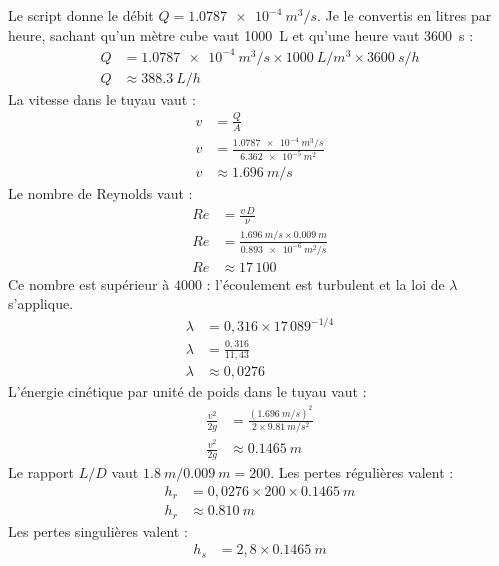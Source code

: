 \begin{demonstration}
Le script donne le débit $Q = \qty{1,0787e-4}{m^3/s}$. Je le convertis en litres par heure, sachant qu'un mètre cube vaut \qty{1000}{L} et qu'une heure vaut \qty{3600}{s} :
\begin{align*}
Q &= \qty{1,0787e-4}{m^3/s} \times \qty{1000}{L/m^3} \times \qty{3600}{s/h}\\
Q &\approx \qty{388,3}{L/h}
\end{align*}
La vitesse dans le tuyau vaut :
\begin{align*}
v &= \frac{Q}{A}\\
v &= \frac{\qty{1,0787e-4}{m^3/s}}{\qty{6,362e-5}{m^2}}\\
v &\approx \qty{1,696}{m/s}
\end{align*}
Le nombre de Reynolds vaut :
\begin{align*}
Re &= \frac{v\,D}{\nu}\\
Re &= \frac{\qty{1,696}{m/s}\times\qty{0,009}{m}}{\qty{0,893e-6}{m^2/s}}\\
Re &\approx 17\,100
\end{align*}
Ce nombre est supérieur à $4000$ : l'écoulement est turbulent et la loi de $\lambda$ s'applique.
\begin{align*}
\lambda &= 0,316 \times 17\,089^{-1/4}\\
\lambda &= \frac{0,316}{11,43}\\
\lambda &\approx 0,0276
\end{align*}
L'énergie cinétique par unité de poids dans le tuyau vaut :
\begin{align*}
\frac{v^2}{2g} &= \frac{(\qty{1,696}{m/s})^2}{2\times\qty{9,81}{m/s^2}}\\
\frac{v^2}{2g} &\approx \qty{0,1465}{m}
\end{align*}
Le rapport $L/D$ vaut $\qty{1,8}{m}/\qty{0,009}{m} = 200$. Les pertes régulières valent :
\begin{align*}
h_r &= 0,0276 \times 200 \times \qty{0,1465}{m}\\
h_r &\approx \qty{0,810}{m}
\end{align*}
Les pertes singulières valent :
\begin{align*}
h_s &= 2,8 \times \qty{0,1465}{m}\\

\end{align*}
\end{demonstration}
